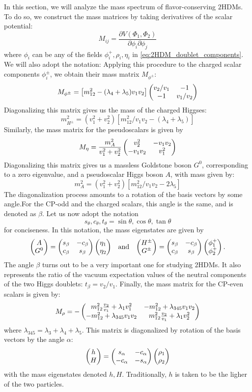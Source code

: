 In this section, we will analyze the mass spectrum of flavor-conserving $2$HDMs. To do so, we construct the mass matrices by taking derivatives of the scalar potential:
\[M_{ij} = \frac{\partial V(\Phi_1,\Phi_2)}{\partial\phi_i\partial\phi_j}\]
where $\phi_{i}$ can be any of the fields $\phi_i^+,\rho_i,\eta_i$ in \eqref{eq:2HDM_doublet_components}. We will also adopt the notation: 
Applying this procedure to the charged scalar components $\phi_i^\pm$, we obtain their mass matrix $M_{\phi^{\pm}}$:
\[M_{\phi^\pm} = \left[m_{12}^2-(\lambda_4+\lambda_5)v_1v_2\right]\begin{pmatrix} v_2/v_1 & -1 \\ -1 & v_1/v_2\end{pmatrix}\]
Diagonalizing this matrix gives us the mass of the charged Higgses:
\[m_{H^\pm}^2 = (v_1^2+v_2^2)[m_{12}^2/v_1v_2-(\lambda_4+\lambda_5)]\]
Similarly, the mass matrix for the pseudoscalars is given by
\[M_{\eta} = \frac{m_A^2}{v_1^2+v_2^2}\begin{pmatrix} v_2^2 & -v_1v_2 \\ -v_1v_2 & v_1^2\end{pmatrix}\]
Diagonalizing this matrix gives us a massless Goldstone boson $G^0$, corresponding to a zero eigenvalue, and a pseudoscalar Higgs boson $A$, with mass given by:
\[m_A^2 = (v_1^2+v_2^2)[m_{12}^2/v_1v_2-2\lambda_5]\]
The diagonalization process amounts to a rotation of the basis vectors by some angle.For the CP-odd and the charged scalars, this angle is the same, and is denoted as $\beta$. Let us now adopt the notation 
\[s_\theta,c_\theta,t_\theta = \sin\theta,\cos\theta,\tan\theta\]
for conciseness. In this notation, the mass eigenstates are given by
\begin{align}
\begin{pmatrix} A \\ G^0\end{pmatrix} = \begin{pmatrix} s_\beta & -c_\beta \\ c_\beta & s_\beta\end{pmatrix}\begin{pmatrix} \eta_1 \\ \eta_2\end{pmatrix}&&\text{and}&&
\begin{pmatrix} H^\pm \\ G^\pm\end{pmatrix} = \begin{pmatrix} s_\beta & -c_\beta \\ c_\beta & s_\beta\end{pmatrix}\begin{pmatrix} \phi_1^+ \\ \phi_2^+\end{pmatrix}.
\end{align}
The angle $\beta$ turns out to be a very important one for studying $2$HDMs. It also represents the ratio of the vacuum expectation values of the neutral components of the two Higgs doublets: $t_\beta = v_2/v_1$.
Finally, the mass matrix for the CP-even scalars is given by:
\[M_{\rho} = -\begin{pmatrix} m_{12}^2\frac{v_2}{v_1}+\lambda_1v_1^2 & -m_{12}^2+\lambda_{345}v_1v_2 \\ -m_{12}^2+\lambda_{345}v_1v_2 & m_{12}^2\frac{v_2}{v_1}+\lambda_1v_2^2\end{pmatrix}\]
where $\lambda_{345} = \lambda_3+\lambda_4+\lambda_5$. This matrix is diagonalized by rotation of the basis vectors by the angle $\alpha$:
\[\begin{pmatrix} h \\ H\end{pmatrix} = \begin{pmatrix} s_\alpha & -c_\alpha \\ -c_\alpha & -s_\alpha\end{pmatrix}\begin{pmatrix} \rho_1 \\ \rho_2\end{pmatrix}\]
with the mass eigenstates denoted $h,H$. Traditionally, $h$ is taken to be the ligher of the two particles. 

